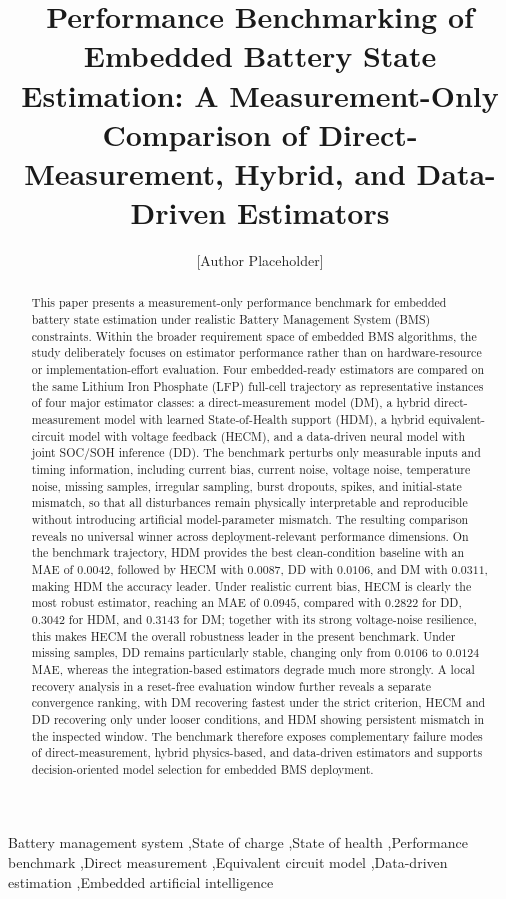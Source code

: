\documentclass[review]{elsarticle}
\date{}
\begin{document}
\linenumbers
\begin{frontmatter}
\title{Performance Benchmarking of Embedded Battery State Estimation: A Measurement-Only Comparison of Direct-Measurement, Hybrid, and Data-Driven Estimators}
\author[1]{[Author Placeholder]}
\begin{abstract}
This paper presents a measurement-only performance benchmark for embedded battery state estimation under realistic Battery Management System (BMS) constraints. Within the broader requirement space of embedded BMS algorithms, the study deliberately focuses on estimator performance rather than on hardware-resource or implementation-effort evaluation. Four embedded-ready estimators are compared on the same Lithium Iron Phosphate (LFP) full-cell trajectory as representative instances of four major estimator classes: a direct-measurement model (DM), a hybrid direct-measurement model with learned State-of-Health support (HDM), a hybrid equivalent-circuit model with voltage feedback (HECM), and a data-driven neural model with joint SOC/SOH inference (DD). The benchmark perturbs only measurable inputs and timing information, including current bias, current noise, voltage noise, temperature noise, missing samples, irregular sampling, burst dropouts, spikes, and initial-state mismatch, so that all disturbances remain physically interpretable and reproducible without introducing artificial model-parameter mismatch. The resulting comparison reveals no universal winner across deployment-relevant performance dimensions. On the benchmark trajectory, HDM provides the best clean-condition baseline with an MAE of $0.0042$, followed by HECM with $0.0087$, DD with $0.0106$, and DM with $0.0311$, making HDM the accuracy leader. Under realistic current bias, HECM is clearly the most robust estimator, reaching an MAE of $0.0945$, compared with $0.2822$ for DD, $0.3042$ for HDM, and $0.3143$ for DM; together with its strong voltage-noise resilience, this makes HECM the overall robustness leader in the present benchmark. Under missing samples, DD remains particularly stable, changing only from $0.0106$ to $0.0124$ MAE, whereas the integration-based estimators degrade much more strongly. A local recovery analysis in a reset-free evaluation window further reveals a separate convergence ranking, with DM recovering fastest under the strict criterion, HECM and DD recovering only under looser conditions, and HDM showing persistent mismatch in the inspected window. The benchmark therefore exposes complementary failure modes of direct-measurement, hybrid physics-based, and data-driven estimators and supports decision-oriented model selection for embedded BMS deployment.
\end{abstract}
\begin{keyword}
Battery management system \sep State of charge \sep State of health \sep Performance benchmark \sep Direct measurement \sep Equivalent circuit model \sep Data-driven estimation \sep Embedded artificial intelligence
\end{keyword}
\end{frontmatter}
\end{document}

